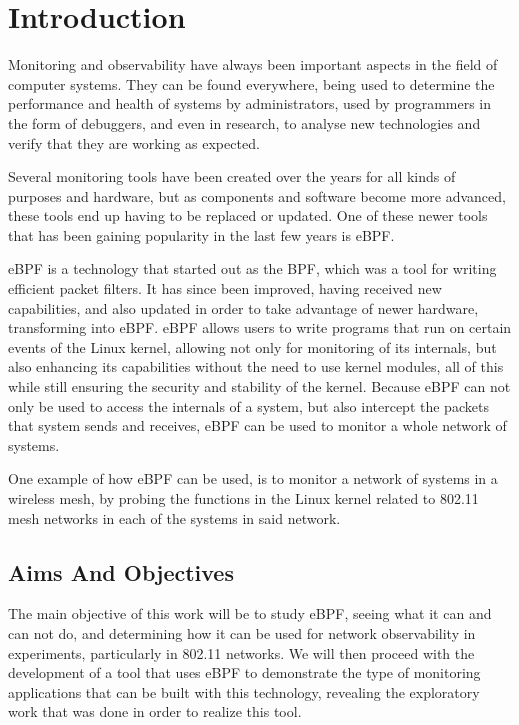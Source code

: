 \chapter{Introduction}\label{chap:intro}

Monitoring and observability have always been important aspects in the field of
computer systems. They can be found everywhere, being used to determine the
performance and health of systems by administrators, used by programmers in the
form of debuggers, and even in research, to analyse new technologies and verify
that they are working as expected.

Several monitoring tools have been created over the years for all kinds of
purposes and hardware, but as components and software become more advanced,
these tools end up having to be replaced or updated. One of these newer tools
that has been gaining popularity in the last few years is eBPF.

eBPF is a technology that started out as the \ac{BPF}, which was a tool for
writing efficient packet filters. It has since been improved, having received
new capabilities, and also updated in order to take advantage of newer hardware,
transforming into eBPF. eBPF allows users to write programs that run on certain
events of the Linux kernel, allowing not only for monitoring of its internals,
but also enhancing its capabilities without the need to use kernel modules, all
of this while still ensuring the security and stability of the kernel. Because
eBPF can not only be used to access the internals of a system, but also
intercept the packets that system sends and receives, eBPF can be used to
monitor a whole network of systems.

One example of how eBPF can be used, is to monitor a network of systems in a
wireless mesh, by probing the functions in the Linux kernel related to 802.11
mesh networks in each of the systems in said network.

\section{Aims And Objectives}

The main objective of this work will be to study eBPF, seeing what it can and
can not do, and determining how it can be used for network observability in
experiments, particularly in 802.11 networks. We will then proceed with the
development of a tool that uses eBPF to demonstrate the type of monitoring
applications that can be built with this technology, revealing the exploratory
work that was done in order to realize this tool.

